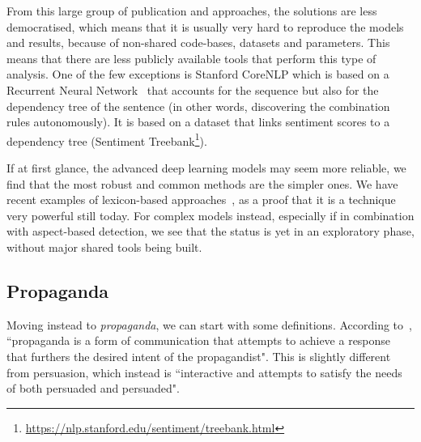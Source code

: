 
From this large group of publication and approaches, the solutions are less democratised, which means that it is usually very hard to reproduce the models and results, because of non-shared code-bases, datasets and parameters.
This means that there are less publicly available tools that perform this type of analysis.
One of the few exceptions is Stanford CoreNLP which is based on a Recurrent Neural Network~\citep{socher2013recursive} that accounts for the sequence but also for the dependency tree of the sentence (in other words, discovering the combination rules autonomously). It is based on a dataset that links sentiment scores to a dependency tree (Sentiment Treebank\footnote{\url{https://nlp.stanford.edu/sentiment/treebank.html}}).

If at first glance, the advanced deep learning models may seem more reliable, we find that the most robust and common methods are the simpler ones.
We have recent examples of lexicon-based approaches~\citep{okango2022dictionary,mitra2020sentiment}, as a proof that it is a technique very powerful still today.
For complex models instead, especially if in combination with aspect-based detection, we see that the status is yet in an exploratory phase, without major shared tools being built.

\subsection{\statusgreen Propaganda}
\label{sec:lit_propaganda}

Moving instead to \emph{propaganda}, we can start with some definitions.
According to~\cite{jowett2012propaganda}, ``propaganda  is  a  form  of  communication  that  attempts  to  achieve a  response  that  furthers  the  desired  intent  of  the  propagandist". This is slightly different from persuasion, which instead is ``interactive and attempts to satisfy the needs of both persuaded and persuaded".





